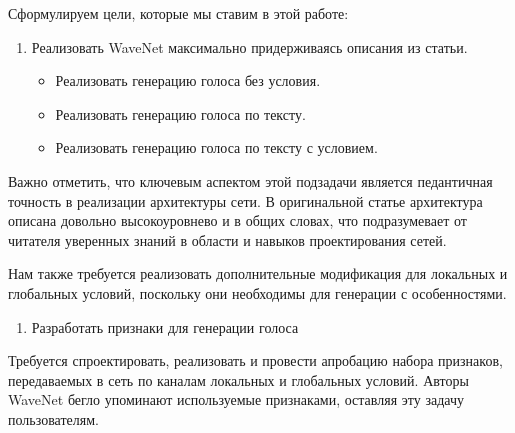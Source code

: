 \documentclass[../diploma.tex]{subfiles}
\begin{document}
Сформулируем цели, которые мы ставим в этой работе:

\begin{enumerate}
    \item Реализовать WaveNet максимально придерживаясь описания из статьи.
    \begin{itemize}
        \item Реализовать генерацию голоса без условия.
        \item Реализовать генерацию голоса по тексту.
        \item Реализовать генерацию голоса по тексту с условием.
    \end{itemize}    
\end{enumerate}

Важно отметить, что ключевым аспектом этой подзадачи является педантичная точность в реализации архитектуры сети.
В оригинальной статье архитектура описана довольно высокоуровнево и в общих словах, что подразумевает от читателя уверенных знаний в области и навыков проектирования сетей.

Нам также требуется реализовать дополнительные модификация для локальных и глобальных условий, поскольку они необходимы для генерации с особенностями.



\begin{enumerate}[resume]
    \item Разработать признаки для генерации голоса
\end{enumerate}

Требуется спроектировать, реализовать и провести апробацию набора признаков, передаваемых в сеть по каналам локальных и глобальных условий. Авторы WaveNet бегло упоминают используемые признаками, оставляя эту задачу пользователям. 
\end{document}
